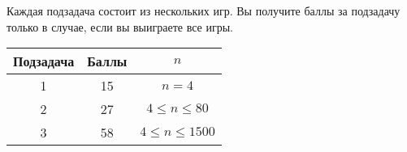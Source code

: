 Каждая подзадача состоит из нескольких игр. Вы получите баллы за подзадачу только в
случае, если вы выиграете все игры.

\begin{center}
\renewcommand{\arraystretch}{1.5}
\begin{tabular}{|c|c|c|}
\hline
Подзадача & Баллы & $n$ \\
\hline
1 &  15 & $n = 4$ \\
\hline
2 & 27 & $4 \le n \le 80$ \\
\hline
3 & 58 & $4 \le n \le 1500$ \\
\hline
\end{tabular}
\end{center}
